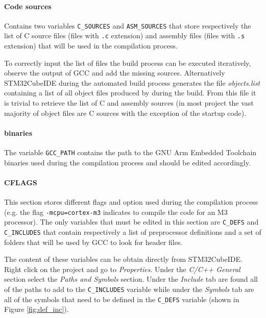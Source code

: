 \documentclass{article}
\begin{document}
\paragraph{Code sources} Contains two variables \verb|C_SOURCES| and \verb|ASM_SOURCES| that store respectively the list of C source files (files with \verb|.c| extension) and assembly files (files with \verb|.s| extension) that will be used in the compilation process.

To correctly input the list of files the build process can be executed iteratively, observe the output of GCC and add the missing sources. Alternatively STM32CubeIDE during the automated build process generates the file \textit{objects.list} containing a list of all object files produced by during the build. From this file it is trivial to retrieve the list of C and assembly sources (in most project the vast majority of object files are C sources with the exception of the startup code).

\paragraph{binaries} The variable \verb|GCC_PATH| contains the path to the GNU Arm Embedded Toolchain binaries used during the compilation process and should be edited accordingly.

\paragraph{CFLAGS} This section stores different flags and option used during the compilation process (e.g. the flag \verb|-mcpu=cortex-m3| indicates to compile the code for an M3 processor). The only variables that must be edited in this section are \verb|C_DEFS| and \verb|C_INCLUDES| that contain respectively a list of preprocessor definitions and a set of folders that will be used by GCC to look for header files.

The content of these variables can be obtain directly from STM32CubeIDE. Right click on the project and go to \textit{Properties}. Under the \textit{C/C++ General} section select the \textit{Paths and Symbols} section. Under the \textit{Include} tab are found all of the paths to add to the \verb|C_INCLUDES| variable while under the \textit{Symbols} tab are all of the symbols that need to be defined in the \verb|C_DEFS| variable (shown in Figure \ref{fig:def_inc}).
\end{document}
